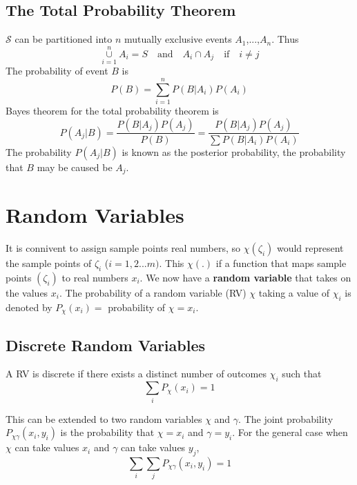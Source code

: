 \documentclass{article}
\begin{document}
    \subsection{The Total Probability Theorem}
    $\mathcal{S}$ can be partitioned into $n$ mutually exclusive events $A_1$,...,$A_n$. Thus
    \begin{equation}
        \underset{i=1}{\overset{n}{\cup}}A_i = S \quad \textrm{and} \quad A_i \cap A_j \quad \textrm{if} \quad i \ne j
    \end{equation}
    The probability of event $B$ is
    \begin{equation}
        P(B) = \sum_{i=1}^{n}P(B|A_i)P(A_i)
    \end{equation}
    Bayes theorem for the total probability theorem is
    \begin{equation}
        P(A_j|B) = \frac{P(B|A_j)P(A_j)}{P(B)} = \frac{P(B|A_j)P(A_j)}{\sum P(B|A_i)P(A_i)}
    \end{equation}
    The probability $P(A_j|B)$ is known as the posterior probability, the probability that $B$ may be caused
    be $A_j$.

    \section{Random Variables}
    It is connivent to assign sample points real numbers, so $\chi(\zeta_i)$ would represent the sample points of
    $\zeta_i$ ($i=1,2...m)$. This $\chi(.)$ if a function that maps sample points $(\zeta_i)$ to real numbers
    $x_i$. We now have a \textbf{random variable} that takes on the values $x_i$. The probability of 
    a random variable (RV) $\chi$ taking a value of $\chi_i$ is denoted by $P_{\chi}(x_i) = $ probability
    of $\chi = x_i$.

    \subsection{Discrete Random Variables}
    A RV is discrete if there exists a distinct number of outcomes $\chi_i$ such that
    \begin{equation}
        \sum_iP_{\chi}(x_i) = 1
    \end{equation}

    This can be extended to two random variables $\chi$ and $\gamma$. The joint probability $P_{\chi\gamma}
    (x_i, y_i)$ is the probability that $\chi = x_i$ and $\gamma = y_i$. For the general case when $\chi$
    can take values $x_i$ and $\gamma$ can take values $y_j$,
    \begin{equation}
        \sum_i \sum_jP_{\chi\gamma}(x_i, y_i) = 1
    \end{equation}
\end{document}
